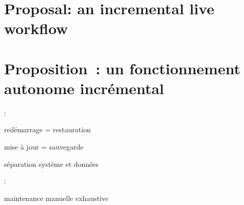 \ml
{\chapter{Proposal: an incremental live workflow}}
{\chapter{Proposition : un fonctionnement autonome incrémental}}

:
\begin{itmz}
\item{
{redémarrage = restauration}}
\item{
{mise à jour = sauvegarde}}
\item{
{séparation système et données}}
\end{itmz}

:
\begin{itmz}
\item{
{maintenance manuelle exhaustive}}
\end{itmz}



